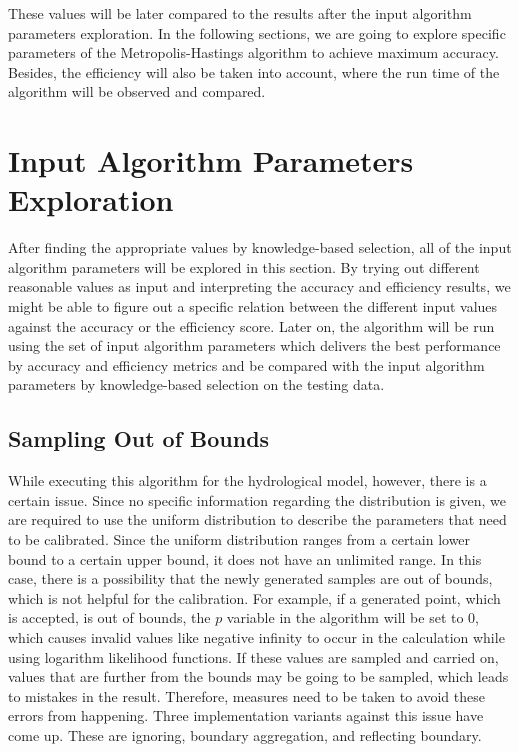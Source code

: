 These values will be later compared to the results after the input algorithm parameters exploration. In the following sections, we are going to explore specific parameters of the Metropolis-Hastings algorithm to achieve maximum accuracy. Besides, the efficiency will also be taken into account, where the run time of the algorithm will be observed and compared.


\section{Input Algorithm Parameters Exploration}
After finding the appropriate values by knowledge-based selection, all of the input algorithm parameters will be explored in this section. By trying out different reasonable values as input and interpreting the accuracy and efficiency results, we might be able to figure out a specific relation between the different input values against the accuracy or the efficiency score. Later on, the algorithm will be run using the set of input algorithm parameters which delivers the best performance by accuracy and efficiency metrics and be compared with the input algorithm parameters by knowledge-based selection on the testing data.

\subsection{Sampling Out of Bounds}
While executing this algorithm for the hydrological model, however, there is a certain issue. Since no specific information regarding the distribution is given, we are required to use the uniform distribution to describe the parameters that need to be calibrated. Since the uniform distribution ranges from a certain lower bound to a certain upper bound, it does not have an unlimited range. In this case, there is a possibility that the newly generated samples are out of bounds, which is not helpful for the calibration. For example, if a generated point, which is accepted, is out of bounds, the $p$ variable in the algorithm will be set to 0, which causes invalid values like negative infinity to occur in the calculation while using logarithm likelihood functions. If these values are sampled and carried on, values that are further from the bounds may be going to be sampled, which leads to mistakes in the result. Therefore, measures need to be taken to avoid these errors from happening. Three implementation variants against this issue have come up. These are ignoring, boundary aggregation, and reflecting boundary.

